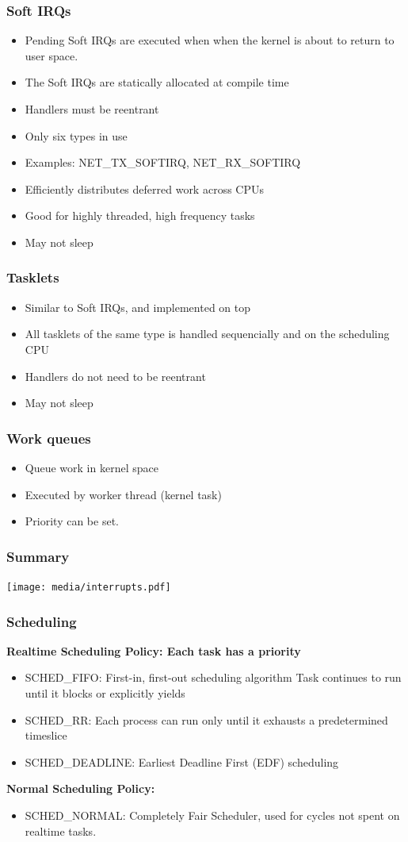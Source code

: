 \documentclass{beamer}
\begin{document}
\begin{frame}
\frametitle{Soft IRQs}
\begin{itemize}
	\item Pending Soft IRQs are executed when when the kernel is about to return to user space.
	\item The Soft IRQs are statically allocated at compile time
	\item Handlers must be reentrant
	\item Only six types in use
	\item Examples: NET\_TX\_SOFTIRQ, NET\_RX\_SOFTIRQ
	\item Efficiently distributes deferred work across CPUs
	\item Good for highly threaded, high frequency tasks
	\item May not sleep
\end{itemize}
\end{frame}

\begin{frame}
\frametitle{Tasklets}
\begin{itemize}
	\item Similar to Soft IRQs, and implemented on top 
	\item All tasklets of the same type is handled sequencially and on the scheduling CPU
	\item Handlers do not  need to be reentrant
	\item May not sleep
\end{itemize}
\end{frame}

\begin{frame}
\frametitle{Work queues}
\begin{itemize}
	\item Queue work in kernel space
	\item Executed by worker thread (kernel task)
	\item Priority can be set.
\end{itemize}
\end{frame}

\begin{frame}
\frametitle{Summary}
\texttt{[image: media/interrupts.pdf]}
\end{frame}

\begin{frame}
\frametitle{Scheduling}
\textbf{Realtime Scheduling Policy: Each task has a priority}
\begin{itemize}
	\item SCHED\_FIFO: First-in, first-out scheduling algorithm Task continues to run until it blocks or explicitly yields
	\item SCHED\_RR: Each process can run only until it exhausts a predetermined timeslice
	\item SCHED\_DEADLINE: Earliest Deadline First (EDF) scheduling
\end{itemize}
\textbf{Normal Scheduling Policy:}
\begin{itemize}
	\item SCHED\_NORMAL: Completely Fair Scheduler, used for cycles not spent on realtime tasks.
\end{itemize}
\end{frame}
\end{document}
